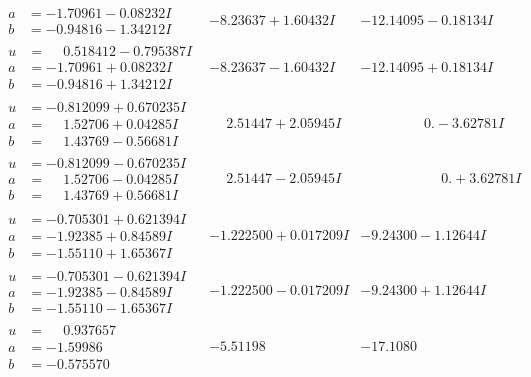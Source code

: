 \documentclass[1p]{elsarticle_modified}
\theoremstyle{definition}
\begin{document}
$$\begin{array}{c|c|c}
\begin{aligned}
a &= -1.70961 - 0.08232 I \\
b &= -0.94816 - 1.34212 I\end{aligned}
 & -8.23637 + 1.60432 I & -12.14095 - 0.18134 I \\ \hline\begin{aligned}
u &= \phantom{-}0.518412 - 0.795387 I \\
a &= -1.70961 + 0.08232 I \\
b &= -0.94816 + 1.34212 I\end{aligned}
 & -8.23637 - 1.60432 I & -12.14095 + 0.18134 I \\ \hline\begin{aligned}
u &= -0.812099 + 0.670235 I \\
a &= \phantom{-}1.52706 + 0.04285 I \\
b &= \phantom{-}1.43769 - 0.56681 I\end{aligned}
 & \phantom{-}2.51447 + 2.05945 I & \phantom{-0.000000 } 0. - 3.62781 I \\ \hline\begin{aligned}
u &= -0.812099 - 0.670235 I \\
a &= \phantom{-}1.52706 - 0.04285 I \\
b &= \phantom{-}1.43769 + 0.56681 I\end{aligned}
 & \phantom{-}2.51447 - 2.05945 I & \phantom{-0.000000 -}0. + 3.62781 I \\ \hline\begin{aligned}
u &= -0.705301 + 0.621394 I \\
a &= -1.92385 + 0.84589 I \\
b &= -1.55110 + 1.65367 I\end{aligned}
 & -1.222500 + 0.017209 I & -9.24300 - 1.12644 I \\ \hline\begin{aligned}
u &= -0.705301 - 0.621394 I \\
a &= -1.92385 - 0.84589 I \\
b &= -1.55110 - 1.65367 I\end{aligned}
 & -1.222500 - 0.017209 I & -9.24300 + 1.12644 I \\ \hline\begin{aligned}
u &= \phantom{-}0.937657\phantom{ +0.000000I} \\
a &= -1.59986\phantom{ +0.000000I} \\
b &= -0.575570\phantom{ +0.000000I}\end{aligned}
 & -5.51198\phantom{ +0.000000I} & -17.1080\phantom{ +0.000000I} \\ \hline\begin{aligned}

\end{aligned}
\end{array}$$
\end{document}

